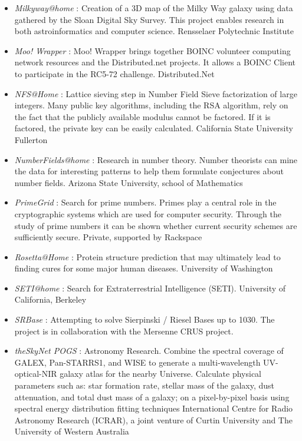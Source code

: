\begin{itemize}
	\item {\em Milkyway@home} : Creation of a 3D map of the Milky Way galaxy using data gathered by the Sloan Digital Sky Survey. This project enables research in both astroinformatics and computer science.	Rensselaer Polytechnic Institute
	\item {\em Moo! Wrapper} : Moo! Wrapper brings together BOINC volunteer computing network resources and the Distributed.net projects. It allows a BOINC Client to participate in the RC5-72 challenge.	Distributed.Net	
	\item {\em NFS@Home} : Lattice sieving step in Number Field Sieve factorization of large integers. Many public key algorithms, including the RSA algorithm, rely on the fact that the publicly available modulus cannot be factored. If it is factored, the private key can be easily calculated.	California State University Fullerton	
	\item {\em NumberFields@home} : Research in number theory. Number theorists can mine the data for interesting patterns to help them formulate conjectures about number fields.	Arizona State University, school of Mathematics	
	\item {\em PrimeGrid} : Search for prime numbers. Primes play a central role in the cryptographic systems which are used for computer security. Through the study of prime numbers it can be shown whether current security schemes are sufficiently secure.	Private, supported by Rackspace
	\item {\em Rosetta@Home} : Protein structure prediction that may ultimately lead to finding cures for some major human diseases.	University of Washington
	\item {\em SETI@home} : Search for Extraterrestrial Intelligence (SETI). University of California, Berkeley
	\item {\em SRBase} : Attempting to solve Sierpinski / Riesel Bases up to 1030.	The project is in collaboration with the Mersenne CRUS project.	
	\item {\em theSkyNet POGS} : Astronomy Research. Combine the spectral coverage of GALEX, Pan-STARRS1, and WISE to generate a multi-wavelength UV-optical-NIR galaxy atlas for the nearby Universe. Calculate physical parameters such as: star formation rate, stellar mass of the galaxy, dust attenuation, and total dust mass of a galaxy; on a pixel-by-pixel basis using spectral energy distribution fitting techniques	International Centre for Radio Astronomy Research (ICRAR), a joint venture of Curtin University and The University of Western Australia	

\end{itemize}
